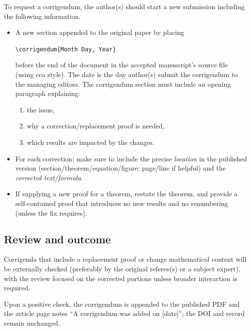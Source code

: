 \documentclass[12pt]{article}
\begin{document}
To request a corrigendum, the author(s) should start a new submission
including the following information.

\begin{itemize}
\item A new section appended to the original paper by placing
  \begin{center}
    \verb|\corrigendum{Month Day, Year}|
  \end{center}
  before the end of the document in the accepted manuscript’s source
  file (using cca style). The date is the day author(s) submit the
  corrigendum to the managing editors.  The corrigendum section must
  include an opening paragraph explaining:
  \begin{enumerate}[label=(\roman*)]
  \item the issue,
  \item why a correction/replacement proof is needed,
  \item which results are impacted by the changes.
  \end{enumerate}
\item For each correction: make sure to include the precise
  \emph{location} in the published version
  (section/theorem/equation/figure; page/line if helpful) and the
  \emph{corrected text/formula}.
\item If supplying a new proof for a theorem, restate the theorem, and
  provide a self-contained proof that introduces no new results and no
  renumbering (unless the fix requires).
\end{itemize}


\subsection*{Review and outcome}
Corrigenda that include a replacement proof or change mathematical
content will be externally checked (preferably by the original
referee(s) or a subject expert), with the review focused on the
corrected portions unless broader interaction is required.

Upon a positive check, the corrigendum is appended to the published
PDF and the article page notes “A corrigendum was added on [date]”;
the DOI and record remain unchanged.
\end{document}
